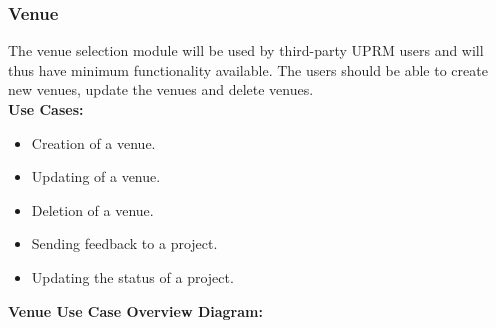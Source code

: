 \subsubsection{Venue}
	The venue selection module will be used by third-party UPRM users and will thus have minimum functionality available. The users should be able to create new venues, update the venues and delete venues.\\
	\textbf{Use Cases:}
	\begin{itemize}
		\item Creation of a venue.
		\item Updating of a venue.
		\item Deletion of a venue.
		\item Sending feedback to a project.
		\item Updating the status of a project.
	\end{itemize}
	\textbf{Venue Use Case Overview Diagram:}\\
	\centerline{}	